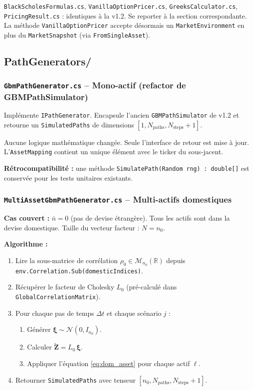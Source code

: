 \documentclass[a4paper,11pt]{article}
\newcommand{\cs}[1]{\texttt{\color{codeinline}#1}}
\begin{document}
\cs{BlackScholesFormulas.cs}, \cs{VanillaOptionPricer.cs}, \cs{GreeksCalculator.cs},
\cs{PricingResult.cs} : identiques \`a la v1.2. Se reporter \`a la section correspondante.
La m\'ethode \cs{VanillaOptionPricer} accepte d\'esormais un \cs{MarketEnvironment}
en plus du \cs{MarketSnapshot} (via \cs{FromSingleAsset}).

\subsection{PathGenerators/}

\subsubsection{\texttt{GbmPathGenerator.cs} -- Mono-actif (refactor de GBMPathSimulator)}

Impl\'emente \cs{IPathGenerator}. Encapsule l'ancien \cs{GBMPathSimulator} de v1.2
et retourne un \cs{SimulatedPaths} de dimensions $[1, N_\text{paths}, N_\text{steps}+1]$.

Aucune logique math\'ematique chang\'ee. Seule l'interface de retour est mise \`a jour.
L'\cs{AssetMapping} contient un unique \'el\'ement avec le ticker du sous-jacent.

\textbf{R\'etrocompatibilit\'e :} une m\'ethode \cs{SimulatePath(Random rng) : double[]} est
conserv\'ee pour les tests unitaires existants.

\subsubsection{\texttt{MultiAssetGbmPathGenerator.cs} -- Multi-actifs domestiques}

\textbf{Cas couvert :} $\bar{n} = 0$ (pas de devise \'etrang\`ere). Tous les actifs sont
dans la devise domestique. Taille du vecteur facteur : $N = n_0$.

\textbf{Algorithme :}
\begin{enumerate}[leftmargin=1.5em]
  \item Lire la sous-matrice de corr\'elation $\rho_0 \in \mathcal{M}_{n_0}(\mathbb{R})$
        depuis \cs{env.Correlation.Sub(domesticIndices)}.
  \item R\'ecup\'erer le facteur de Cholesky $L_0$ (pr\'e-calcul\'e dans \cs{GlobalCorrelationMatrix}).
  \item Pour chaque pas de temps $\Delta t$ et chaque sc\'enario $j$ :
        \begin{enumerate}[leftmargin=1.5em]
          \item G\'en\'erer $\boldsymbol{\xi} \sim \mathcal{N}(0, I_{n_0})$.
          \item Calculer $\widetilde{\mathbf{Z}} = L_0\,\boldsymbol{\xi}$.
          \item Appliquer l'\'equation \eqref{eq:dom_asset} pour chaque actif $\ell$.
        \end{enumerate}
  \item Retourner \cs{SimulatedPaths} avec tenseur $[n_0, N_\text{paths}, N_\text{steps}+1]$.
\end{enumerate}
\end{document}
